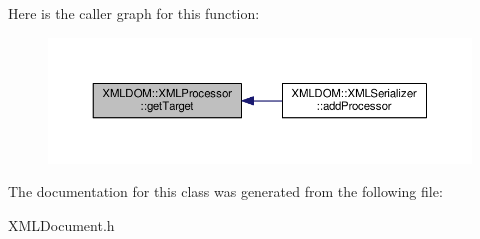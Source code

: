 Here is the caller graph for this function\+:
\nopagebreak
\begin{figure}[H]
\begin{center}
\leavevmode
\includegraphics[width=350pt]{d0/db0/classXMLDOM_1_1XMLProcessor_a1999a89e597d5db3334859a9e41f4ac8_icgraph}
\end{center}
\end{figure}




The documentation for this class was generated from the following file\+:\begin{DoxyCompactItemize}
\item 
X\+M\+L\+Document.\+h\end{DoxyCompactItemize}
